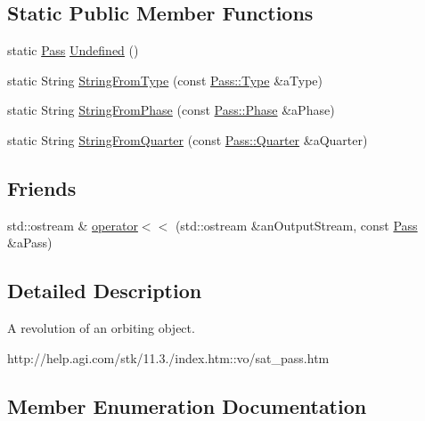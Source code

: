 \subsection*{Static Public Member Functions}
\begin{DoxyCompactItemize}
\item 
static \hyperlink{classostk_1_1astro_1_1trajectory_1_1orbit_1_1_pass}{Pass} \hyperlink{classostk_1_1astro_1_1trajectory_1_1orbit_1_1_pass_ad1f97ee5361bce2ea9d3dd2211fa52bc}{Undefined} ()
\item 
static String \hyperlink{classostk_1_1astro_1_1trajectory_1_1orbit_1_1_pass_ae3ba229e53fe1041c96a44c1609d3d28}{String\+From\+Type} (const \hyperlink{classostk_1_1astro_1_1trajectory_1_1orbit_1_1_pass_a74449dbd104c6a24462b373cc55febcc}{Pass\+::\+Type} \&a\+Type)
\item 
static String \hyperlink{classostk_1_1astro_1_1trajectory_1_1orbit_1_1_pass_aff910b1d0ea72c538ee087ff39cd62fa}{String\+From\+Phase} (const \hyperlink{classostk_1_1astro_1_1trajectory_1_1orbit_1_1_pass_a9fb48e13f29c899a8b74c43091fe4203}{Pass\+::\+Phase} \&a\+Phase)
\item 
static String \hyperlink{classostk_1_1astro_1_1trajectory_1_1orbit_1_1_pass_a6de5cf26676f3375ed5ebe16c3d963c1}{String\+From\+Quarter} (const \hyperlink{classostk_1_1astro_1_1trajectory_1_1orbit_1_1_pass_a4c5f54feec066a636b1e7293aacf0114}{Pass\+::\+Quarter} \&a\+Quarter)
\end{DoxyCompactItemize}
\subsection*{Friends}
\begin{DoxyCompactItemize}
\item 
std\+::ostream \& \hyperlink{classostk_1_1astro_1_1trajectory_1_1orbit_1_1_pass_a62c2257085205d3c714c5ca4350f84f4}{operator$<$$<$} (std\+::ostream \&an\+Output\+Stream, const \hyperlink{classostk_1_1astro_1_1trajectory_1_1orbit_1_1_pass}{Pass} \&a\+Pass)
\end{DoxyCompactItemize}


\subsection{Detailed Description}
A revolution of an orbiting object. 

http\+://help.agi.\+com/stk/11.3./index.htm\+::vo/sat\+\_\+pass.htm 

\subsection{Member Enumeration Documentation}
\mbox{\label{classostk_1_1astro_1_1trajectory_1_1orbit_1_1_pass_a9fb48e13f29c899a8b74c43091fe4203}} 
